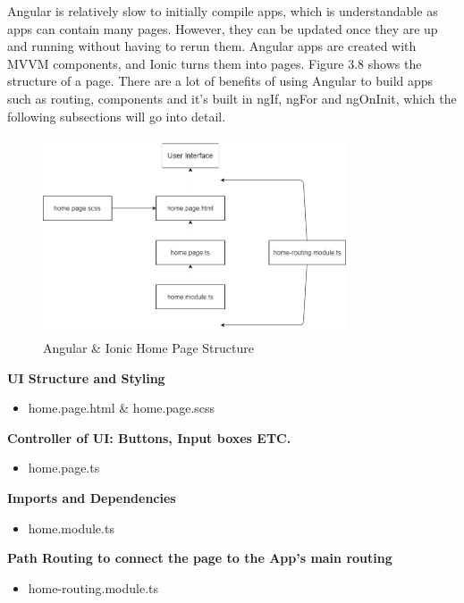 Angular is relatively slow to initially compile apps, which is understandable as apps can contain many pages. However, they can be updated once they are up and running without having to rerun them. Angular apps are created with MVVM components, and Ionic turns them into pages. Figure 3.8 shows the structure of a page. There are a lot of benefits of using Angular to build apps such as routing, components and it's built in ngIf, ngFor and ngOnInit, which the following subsections will go into detail.

\begin{figure}[H]
    \caption{Angular \& Ionic Home Page Structure}
    \label{image:ngHomePage}
    \centering
    \includegraphics[width=0.8\textwidth]{images/misc/ng-homepage.png}
\end{figure}

\textbf{UI Structure and Styling}
\begin{itemize}
    \item home.page.html \& home.page.scss
\end{itemize} 

\textbf{Controller of UI: Buttons, Input boxes ETC.}
\begin{itemize}
    \item home.page.ts 
\end{itemize} 

\textbf{Imports and Dependencies}
\begin{itemize}
    \item home.module.ts
\end{itemize} 

\textbf{Path Routing to connect the page to the App's main routing}
\begin{itemize}
    \item home-routing.module.ts
\end{itemize} 

